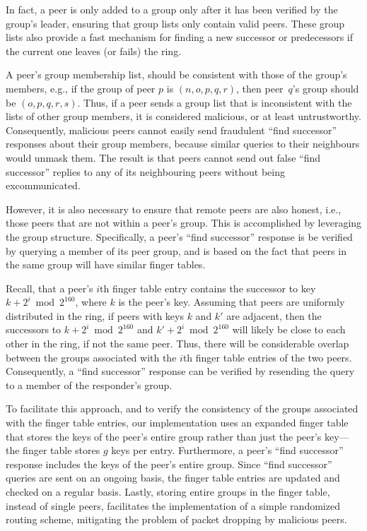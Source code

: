 \documentclass[11pt]{article}
\begin{document}
In fact, a peer is only added to a group only after it has been 
verified by the group's leader, ensuring that group lists only 
contain valid peers.  These group lists also provide a fast 
mechanism for finding a new successor or predecessors if the 
current one leaves (or fails) the ring.

A peer's group membership list, should be consistent with those of
the group's members, e.g., if the group of peer $p$ is $(n,o,p,q,r)$,
then peer~$q$'s group should be $(o,p,q,r,s)$.  Thus, if a peer
sends a group list that is inconsistent with the lists of other
group members, it is considered malicious, or at least untrustworthy.
Consequently, malicious peers cannot easily send fraudulent ``find
successor'' responses about their group members, because similar
queries to their neighbours would unmask them.  The result is that
peers cannot send out false ``find successor'' replies to any of
its neighbouring peers without being excommunicated.

However, it is also necessary to ensure that remote peers are also
honest, i.e., those peers that are not within a peer's group.  This
is accomplished by leveraging the group structure.  Specifically,
a peer's ``find successor'' response is be verified by querying a
member of its peer group, and is based on the fact that peers in the 
same group will have similar finger tables.  

Recall, that a peer's $i$th finger table entry contains the successor
to key $k + 2^i \bmod 2^{160}$, where $k$ is the peer's key.  Assuming
that peers are uniformly distributed in the ring, if peers with
keys $k$ and $k'$ are adjacent, then the successors to $k + 2^i
\bmod 2^{160}$ and $k' + 2^i \bmod 2^{160}$ will likely be close
to each other in the ring, if not the same peer.  Thus, there will
be considerable overlap between the groups associated with the $i$th
finger table entries of the two peers.  Consequently, a ``find
successor'' response can be verified by resending the query to a
member of the responder's group.

To facilitate this approach, and to verify the consistency of the
groups associated with the finger table entries, our implementation
uses an expanded finger table that stores the keys of the peer's
entire group rather than just the peer's key---the finger table
stores $g$ keys per entry.  Furthermore, a peer's ``find successor''
response includes the keys of the peer's entire group.  Since ``find
successor'' queries are sent on an ongoing basis, the finger table
entries are updated and checked on a regular basis.  Lastly, storing
entire groups in the finger table, instead of single peers, facilitates
the implementation of a simple randomized routing scheme, mitigating
the problem of packet dropping by malicious peers.
\end{document}
